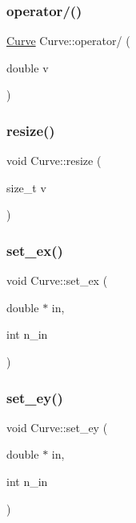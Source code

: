 \mbox{\label{class_curve_aff93a6c6139f9cc008d202ca5ea995e0}} 
\subsubsection{\texorpdfstring{operator/()}{operator/()}\hspace{0.1cm}{\footnotesize\ttfamily [2/2]}}
{\footnotesize\ttfamily \hyperlink{class_curve}{Curve} Curve\+::operator/ (\begin{DoxyParamCaption}\item[{double}]{v }\end{DoxyParamCaption})}

\mbox{\label{class_curve_a69f0cd9336dba793efe1398a6997c5a0}} 
\subsubsection{\texorpdfstring{resize()}{resize()}}
{\footnotesize\ttfamily void Curve\+::resize (\begin{DoxyParamCaption}\item[{size\+\_\+t}]{v }\end{DoxyParamCaption})}

\mbox{\label{class_curve_ab3e5da7ebd194f1c4655d4a1e1099541}} 
\subsubsection{\texorpdfstring{set\+\_\+ex()}{set\_ex()}}
{\footnotesize\ttfamily void Curve\+::set\+\_\+ex (\begin{DoxyParamCaption}\item[{double $\ast$}]{in,  }\item[{int}]{n\+\_\+in }\end{DoxyParamCaption})}

\mbox{\label{class_curve_a11bda872bbbac4856b941eb645ecdd22}} 
\subsubsection{\texorpdfstring{set\+\_\+ey()}{set\_ey()}}
{\footnotesize\ttfamily void Curve\+::set\+\_\+ey (\begin{DoxyParamCaption}\item[{double $\ast$}]{in,  }\item[{int}]{n\+\_\+in }\end{DoxyParamCaption})}

